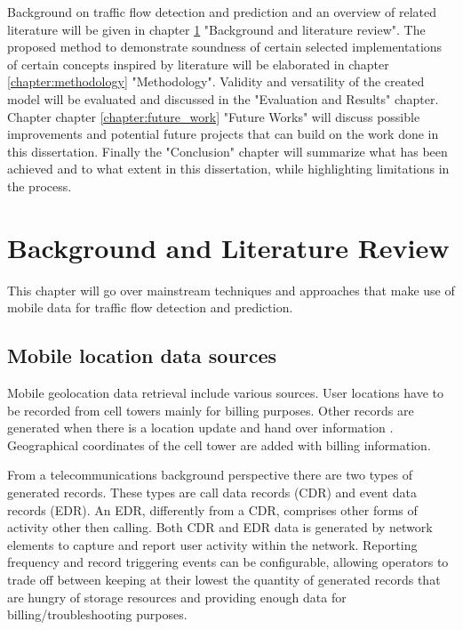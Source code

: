 \documentclass[12pt, a4paper]{report}
\theoremstyle{definition}
\theoremstyle{definition}%
\theoremstyle{definition}%
\theoremstyle{definition}%
\theoremstyle{definition}%
\theoremstyle{definition}%
\begin{document}
 Background on traffic flow detection and prediction and an overview of related literature will be given in chapter \ref{chapter:background} "Background and literature review". The proposed method to demonstrate soundness of certain selected implementations of certain concepts inspired by literature will be elaborated in chapter \ref{chapter:methodology} "Methodology".  Validity and versatility of the created model will be evaluated and discussed in the "Evaluation and Results" chapter. Chapter chapter \ref{chapter:future_work} "Future Works"  will discuss possible improvements and potential future projects that can build on the work done in this dissertation. Finally the "Conclusion" chapter will summarize what has been achieved and to what extent in this dissertation, while highlighting limitations in the process.



\chapter{Background and Literature Review} \label{chapter:background}

This chapter will go over mainstream techniques and approaches that make use of mobile data for traffic flow detection and prediction.

\section{Mobile location data sources} \label{background_mobile_location_data_sources} 

Mobile geolocation data retrieval include various sources. User locations have to be recorded from cell towers mainly for billing purposes. Other records are generated when there is a location update and hand over information \cite{Calabrese2011}. Geographical coordinates of the cell tower are added with billing information. 

From a telecommunications background perspective there are two types of generated records.  These types are call data records (CDR) and event data records (EDR). An EDR, differently from a CDR, comprises other forms of activity other then calling. Both CDR and EDR data is generated by network elements to capture and report user activity within the network. Reporting frequency and record triggering events can be configurable, allowing operators to trade off between keeping at their lowest the quantity of generated records that are hungry of storage resources and providing enough data for billing/troubleshooting purposes.
\end{document}
